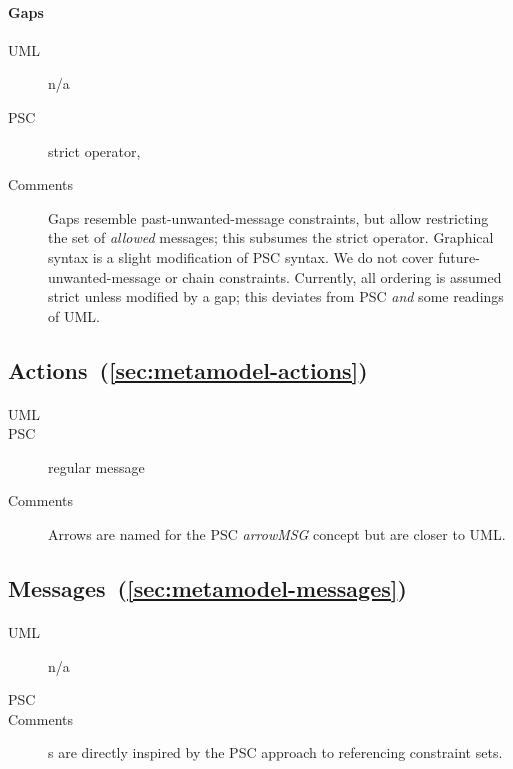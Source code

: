 \paragraph{Gaps}
\begin{description}
\item[UML] n/a
\item[PSC] strict operator, 
\item[Comments]
  Gaps resemble past-unwanted-message constraints, but
  allow restricting the set of \emph{allowed} messages;
  this subsumes the strict operator.  Graphical syntax is a slight
  modification of PSC syntax.  We do not cover
  future-unwanted-message or chain constraints.  Currently, all
  ordering is assumed strict unless modified by a gap; this
  deviates from PSC \emph{and} some readings of UML.
\end{description}
    
\subsection{Actions~(\ref{sec:metamodel-actions})}

\paragraph{\marrowaction}
\begin{description}
\item[UML] 
\item[PSC] regular message
\item[Comments]
  Arrows are named for the PSC \emph{arrowMSG} concept but are closer
  to UML.
\end{description}
      
\subsection{Messages~(\ref{sec:metamodel-messages})}

\paragraph{\mmessageset}
\begin{description}
\item[UML] n/a
\item[PSC] 
\item[Comments]
  \mrefmessageset s are directly inspired by the PSC approach to referencing constraint sets.
\end{description}

